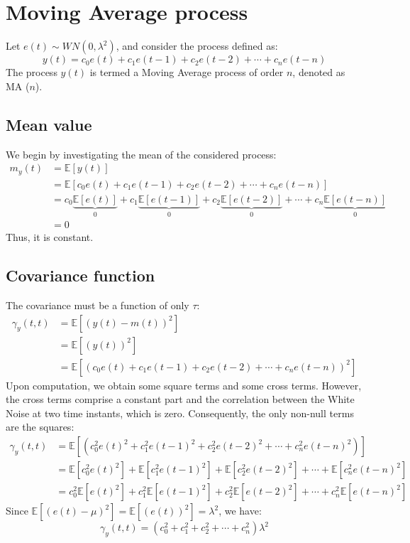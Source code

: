 \section{Moving Average process}

Let $e(t)\sim WN(0,\lambda^2)$, and consider the process defined as:
\[y(t)=c_0e(t)+c_1e(t-1)+c_2e(t-2)+\cdots+c_n e(t-n)\]
The process $y(t)$ is termed a Moving Average process of order $n$, denoted as MA ($n$).

\subsection{Mean value}
We begin by investigating the mean of the considered process:
\begin{align*}
    m_y(t)  &=\mathbb{E}\left[y(t)\right] \\
            &=\mathbb{E}\left[c_0e(t)+c_1e(t-1)+c_2e(t-2)+\cdots+c_n e(t-n)\right] \\
            &=c_0\underbrace{\mathbb{E}\left[e(t)\right]}_0  + c_1\underbrace{\mathbb{E}\left[e(t-1)\right]}_0  + c_2\underbrace{\mathbb{E}\left[e(t-2)\right]}_0  + \cdots + c_n\underbrace{\mathbb{E}\left[e(t-n)\right]}_0 \\
            &=0
\end{align*}
Thus, it is constant.

\subsection{Covariance function}
The covariance must be a function of only $\tau$: 
\begin{align*}
    \gamma_y(t,t)   &=\mathbb{E}\left[{\left(y(t)-m(t)\right)}^2\right] \\
                    &=\mathbb{E}\left[{\left(y(t)\right)}^2\right] \\
                    &=\mathbb{E}\left[{\left(c_0e(t)+c_1e(t-1)+c_2e(t-2)+\cdots+c_n e(t-n)\right)}^2\right] 
\end{align*}
Upon computation, we obtain some square terms and some cross terms. 
However, the cross terms comprise a constant part and the correlation between the White Noise at two time instants, which is zero. 
Consequently, the only non-null terms are the squares:
\begin{align*}
    \gamma_y(t,t)   &=\mathbb{E}\left[\left(c_0^2{e(t)}^2+c_1^2{e(t-1)}^2+c_2^2{e(t-2)}^2+\cdots+c_n^2{e(t-n)}^2\right)\right] \\
                    &=\mathbb{E}\left[c_0^2{e(t)}^2\right]+\mathbb{E}\left[c_1^2{e(t-1)}^2\right]+\mathbb{E}\left[c_2^2{e(t-2)}^2\right]+\cdots+\mathbb{E}\left[c_n^2{e(t-n)}^2\right] \\
                    &=c_0^2\mathbb{E}\left[{e(t)}^2\right]+c_1^2\mathbb{E}\left[{e(t-1)}^2\right]+c_2^2\mathbb{E}\left[{e(t-2)}^2\right]+\cdots+c_n^2\mathbb{E}\left[{e(t-n)}^2\right]
\end{align*}
Since $\mathbb{E}\left[{\left(e(t)-\mu\right)}^2\right]=\mathbb{E}\left[{\left(e(t)\right)}^2\right]=\lambda^2$, we have:
\[\gamma_y(t,t)=\left(c_0^2+c_1^2+c_2^2+\cdots+c_n^2\right)\lambda^2\]

